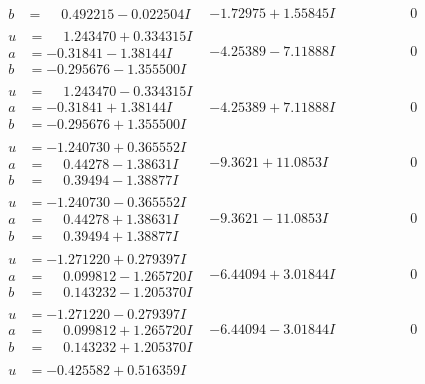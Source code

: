 \documentclass[1p]{elsarticle_modified}
\theoremstyle{definition}
\begin{document}
$$\begin{array}{c|c|c}
\begin{aligned}
b &= \phantom{-}0.492215 - 0.022504 I\end{aligned}
 & -1.72975 + 1.55845 I & \phantom{-0.000000 } 0 \\ \hline\begin{aligned}
u &= \phantom{-}1.243470 + 0.334315 I \\
a &= -0.31841 - 1.38144 I \\
b &= -0.295676 - 1.355500 I\end{aligned}
 & -4.25389 - 7.11888 I & \phantom{-0.000000 } 0 \\ \hline\begin{aligned}
u &= \phantom{-}1.243470 - 0.334315 I \\
a &= -0.31841 + 1.38144 I \\
b &= -0.295676 + 1.355500 I\end{aligned}
 & -4.25389 + 7.11888 I & \phantom{-0.000000 } 0 \\ \hline\begin{aligned}
u &= -1.240730 + 0.365552 I \\
a &= \phantom{-}0.44278 - 1.38631 I \\
b &= \phantom{-}0.39494 - 1.38877 I\end{aligned}
 & -9.3621 + 11.0853 I & \phantom{-0.000000 } 0 \\ \hline\begin{aligned}
u &= -1.240730 - 0.365552 I \\
a &= \phantom{-}0.44278 + 1.38631 I \\
b &= \phantom{-}0.39494 + 1.38877 I\end{aligned}
 & -9.3621 - 11.0853 I & \phantom{-0.000000 } 0 \\ \hline\begin{aligned}
u &= -1.271220 + 0.279397 I \\
a &= \phantom{-}0.099812 - 1.265720 I \\
b &= \phantom{-}0.143232 - 1.205370 I\end{aligned}
 & -6.44094 + 3.01844 I & \phantom{-0.000000 } 0 \\ \hline\begin{aligned}
u &= -1.271220 - 0.279397 I \\
a &= \phantom{-}0.099812 + 1.265720 I \\
b &= \phantom{-}0.143232 + 1.205370 I\end{aligned}
 & -6.44094 - 3.01844 I & \phantom{-0.000000 } 0 \\ \hline\begin{aligned}
u &= -0.425582 + 0.516359 I \\

\end{aligned}
\end{array}$$
\end{document}

